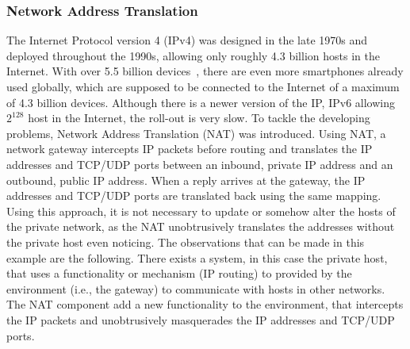 \subsubsection{Network Address Translation}
The Internet Protocol version 4 (IPv4) was designed in the late 1970s and deployed throughout the 1990s, allowing only roughly 4.3 billion hosts in the Internet.
With over 5.5 billion devices~\cite{eriscsson2021report}, there are even more smartphones already used globally, which are supposed to be connected to the Internet of a maximum of 4.3 billion devices.
Although there is a newer version of the IP, IPv6 allowing $2^128$ host in the Internet, the roll-out is very slow.
To tackle the developing problems, Network Address Translation (NAT) was introduced.
Using NAT, a network gateway intercepts IP packets before routing and translates the IP addresses and TCP/UDP ports between an inbound, private IP address and an outbound, public IP address.
When a reply arrives at the gateway, the IP addresses and TCP/UDP ports are translated back using the same mapping.
Using this approach, it is not necessary to update or somehow alter the hosts of the private network, as the NAT unobtrusively translates the addresses without the private host even noticing.
The observations that can be made in this example are the following.
There exists a system, in this case the private host, that uses a functionality or mechanism (IP routing) to provided by the environment (i.e., the gateway) to communicate with hosts in other networks.
The NAT component add a new functionality to the environment, that intercepts the IP packets and unobtrusively masquerades the IP addresses and TCP/UDP ports.


